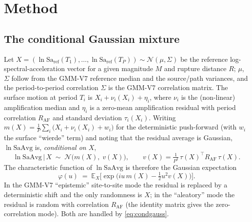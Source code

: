 \documentclass[11pt,a4paper]{article}
\newcommand{\saavg}{\mathrm{SaAvg}}
\newcommand{\E}{\mathbb{E}}
\newcommand{\Normal}{\mathcal{N}}
\begin{document}
\section{Method}

\subsection{The conditional Gaussian mixture}
Let $X=(\ln\mathrm{Sa}_{\mathrm{ref}}(T_1),\dots,\ln\mathrm{Sa}_{\mathrm{ref}}(T_P))
\sim\Normal(\mu,\Sigma)$ be the reference log-spectral-acceleration vector for a
given magnitude $M$ and rupture distance $R$; $\mu$, $\Sigma$ follow from the
GMM-V7 reference median and the source/path variances, and the period-to-period
correlation $\Sigma$ is the GMM-V7 correlation matrix. The surface motion at
period $T_i$ is $X_i+\nu_i(X_i)+\eta_i$, where $\nu_i$ is the (non-linear)
amplification median and $\eta_i$ is a zero-mean amplification residual with
period correlation $R_{\mathrm{AF}}$ and standard deviation $\tau_i(X_i)$.
Writing $m(X)=\tfrac1P\sum_i\big(X_i+\nu_i(X_i)+w_i\big)$ for the deterministic
push-forward (with $w_i$ the surface ``wierde'' term) and noting that the
residual average is Gaussian, $\ln\saavg$ is, \emph{conditional on $X$},
\begin{equation}
  \ln\saavg \,\big|\, X \;\sim\; \Normal\!\big(m(X),\; v(X)\big),
  \qquad
  v(X)=\tfrac{1}{P^2}\,\tau(X)^{\!\top} R_{\mathrm{AF}}\,\tau(X).
  \label{eq:condgauss}
\end{equation}
The characteristic function of $\ln\saavg$ is therefore the Gaussian expectation
\begin{equation}
  \varphi(u)\;=\;\E_X\!\Big[\exp\!\big(iu\,m(X)-\tfrac12 u^2 v(X)\big)\Big].
  \label{eq:cf}
\end{equation}
In the GMM-V7 ``epistemic'' site-to-site mode the residual is replaced by a
deterministic shift and the only randomness is $X$; in the ``aleatory'' mode the
residual is random with correlation $R_{\mathrm{AF}}$ (the identity matrix gives
the zero-correlation mode). Both are handled by \eqref{eq:condgauss}.
\end{document}

